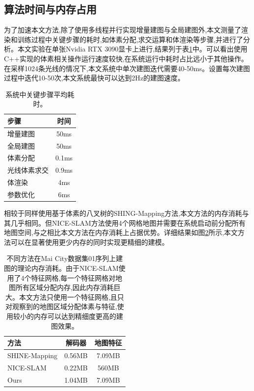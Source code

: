 \subsection{算法时间与内存占用}
为了加速本文方法,除了使用多线程并行实现增量建图与全局建图外,本文测量了渲染和训练过程中关键步骤的耗时,如体素分配,求交运算和体渲染等步骤,并进行了分析。本文实验在单张Nvidia RTX 3090显卡上进行,结果列于表\ref{times}中。可以看出使用C++实现的体素相关操作运行速度较快,在系统运行中耗时占比远小于其他操作。在采样1024条光线的情况下,本文系统中单次建图迭代需要40-50ms。设置每次建图过程中迭代10-50次,本文系统最快可以达到2Hz的建图速度。
\begin{table}[htbp]
    \centering
    \caption{系统中关键步骤平均耗时。}\label{times}
    \begin{tabular}[htbp]{llc}
        \toprule
        \multicolumn{2}{l}{步骤} & 时间\\
        \midrule
        \multicolumn{2}{l}{增量建图} & 50ms\\
        \multicolumn{2}{l}{全局建图} & 50ms \\
        \midrule
        \multicolumn{2}{l}{体素分配} & 0.1ms \\
        \multicolumn{2}{l}{光线体素求交} & 0.9ms \\
        \multicolumn{2}{l}{体渲染} & 4ms \\
        \multicolumn{2}{l}{参数优化} & 6ms \\
        \bottomrule
    \end{tabular}
\end{table}

相较于同样使用基于体素的八叉树的SHING-Mapping方法,本文方法的内存消耗与其几乎相同。但NICE-SLAM方法使用4个网格地图并需要在系统启动前分配所有地图空间,与之相比本文方法在内存消耗上占据优势。详细结果如图\ref{memory}所示,本文方法可以在显著使用更少内存的同时实现更精细的建模。
\begin{table}[htbp]
    \centering
    \caption{不同方法在Mai City数据集01序列上建图的理论内存消耗。由于NICE-SLAM使用了4个特征网格,每一个特征网格对地图所有区域分配内存,因此内存消耗巨大。本文方法只使用一个特征网格,且只对观察到的地图区域分配体素与特征,使用较小的内存可以达到精细度更高的建图效果。}\label{memory}
    \begin{tabular}[htbp]{llcc}
        \toprule
        \multicolumn{2}{l}{方法} &解码器 & 地图特征\\
        \midrule
        \multicolumn{2}{l}{SHINE-Mapping} & 0.56MB & 7.09MB\\
        \multicolumn{2}{l}{NICE-SLAM} & 0.22MB & 560MB\\
        \midrule
        \multicolumn{2}{l}{Ours} & 1.04MB & 7.09MB\\
        \bottomrule
    \end{tabular}
\end{table}


